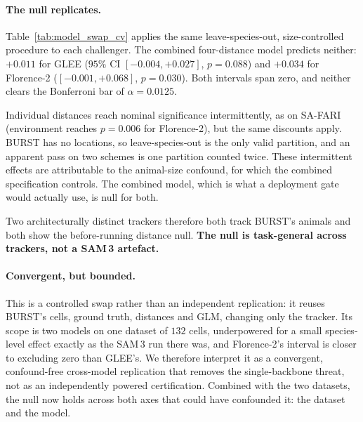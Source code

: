 \paragraph{The null replicates.} Table~\ref{tab:model_swap_cv} applies the same leave-species-out,
size-controlled procedure to each challenger. The combined four-distance model predicts neither: $+0.011$ for
GLEE ($95\%$ CI $[-0.004,+0.027]$, $p=0.088$) and $+0.034$ for Florence-2 ($[-0.001,+0.068]$, $p=0.030$). Both
intervals span zero, and neither clears the Bonferroni bar of $\alpha=0.0125$.

Individual distances reach nominal significance intermittently, as on SA-FARI (environment reaches $p=0.006$
for Florence-2), but the same discounts apply. BURST has no locations, so leave-species-out is the only valid
partition, and an apparent pass on two schemes is one partition counted twice. These intermittent effects are
attributable to the animal-size confound, for which the combined specification controls. The combined model,
which is what a deployment gate would actually use, is null for both.

Two architecturally distinct trackers therefore both track BURST's animals and both show the before-running
distance null. \textbf{The null is task-general across trackers, not a SAM\,3 artefact.}

\paragraph{Convergent, but bounded.} This is a controlled swap rather than an independent replication: it
reuses BURST's cells, ground truth, distances and GLM, changing only the tracker. Its scope is two models on
one dataset of $132$ cells, underpowered for a small species-level effect exactly as the SAM\,3 run there was,
and Florence-2's interval is closer to excluding zero than GLEE's. We therefore interpret it as a convergent,
confound-free cross-model replication that removes the single-backbone threat, not as an independently powered
certification. Combined with the two datasets, the null now holds across both axes that could have confounded
it: the dataset and the model.

